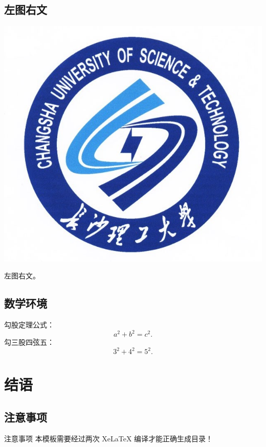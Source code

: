 \documentclass[dvipsnames, svgnames, x11names]{beamer}
\begin{document}
\subsection{左图右文}
\begin{frame}
    \begin{minipage}{.4\linewidth}
    \includegraphics[width=\linewidth]{figure/template/csustlogo_626by572.jpg}
    \end{minipage}
    \quad
    \begin{minipage}{.55\linewidth}
        左图右文。
    \end{minipage}
\end{frame}

\subsection{数学环境}
\begin{frame}
    勾股定理公式：
    \[
        a^2+b^2=c^2.
    \]
    勾三股四弦五：
    \[
        3^2+4^2=5^2.
    \]
\end{frame}

\section{结语}
\subsection{注意事项}
\begin{frame}{注意事项}
    本模板需要经过\alert{两次 XeLaTeX 编译}才能正确生成目录！
\end{frame}
\end{document}

